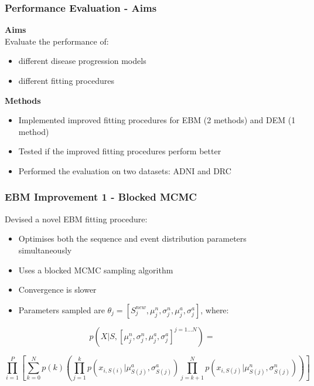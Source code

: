 \documentclass[10pt,xcolor=table]{beamer}
\begin{document}
\begin{frame}
\frametitle{Performance Evaluation - Aims}

\textbf{Aims}\\
Evaluate the performance of:
\begin{itemize}
 \item different disease progression models
 \item different fitting procedures
\end{itemize}

\textbf{Methods}\\
\begin{itemize}
 \item Implemented improved fitting procedures for EBM (2 methods) and DEM (1 method)
 \item Tested if the improved fitting procedures perform better
 \item Performed the evaluation on two datasets: ADNI and DRC
\end{itemize}

\end{frame}

\begin{frame}
\frametitle{EBM Improvement 1 - Blocked MCMC}

Devised a novel EBM fitting procedure:
\begin{itemize}
 \item Optimises both the sequence and event distribution parameters simultaneously
 \item Uses a blocked MCMC sampling algorithm
 \item Convergence is slower
 \item Parameters sampled are  $\theta_j = [S_j^{new}, \mu^n_j, \sigma^n_j, \mu^a_j, \sigma^a_j]$, where:
\end{itemize}

$$p(X|S, [\mu^n_j, \sigma^n_j, \mu^a_j, \sigma^a_j]^{j=1 \dots N}) = $$

\vspace{-1em}
$$ \prod_{i=1}^P \left[ \sum_{k=0}^N p(k) \left( \prod_{j=1}^k p\left(x_{i,S(i)} | \mu^a_{S(j)}, \sigma^a_{S(j)} \right) \prod_{j=k+1}^N p\left(x_{i,S(j)} | \mu^n_{S(j)}, \sigma^n_{S(j)} \right) \right) \right]
$$

\end{frame}
\end{document}
